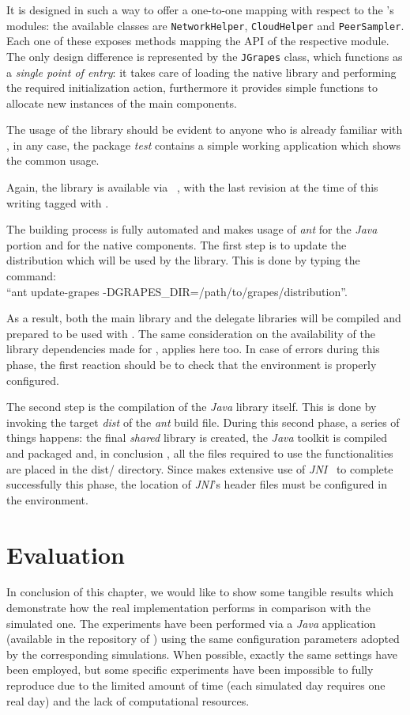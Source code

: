 It is designed in such a way to offer a one-to-one mapping with respect
to the \grapes's modules: the available classes are
\texttt{NetworkHelper}, \texttt{CloudHelper} and
\texttt{PeerSampler}. Each one of these exposes methods mapping the
API of the respective \grapes module. The only design difference is
represented by the \texttt{JGrapes} class, which functions as a
\textit{single point of entry}: it takes care of loading the native
library and performing the required initialization action, furthermore it
provides simple functions to allocate new instances of the main
components.

The usage of the library should be evident to anyone who is already
familiar with \grapes, in any case, the package \emph{test} contains
a simple working application which shows the common usage.

Again, the library is available via \github~\cite{jGRAPES-repo}, with
the last revision at the time of this writing tagged with
\thesistag.

The building process is fully automated and makes usage of \emph{ant}
for the \emph{Java} portion and \make for the native components. The
first step is to update the \grapes distribution which will be used by
the library.
This is done by typing the command: \\
``ant update-grapes
-DGRAPES\_DIR=/path/to/grapes/distribution''.

As a result, both the
main \grapes library and the \cloudhelper delegate libraries will be
compiled and prepared to be used with \jgrapes. The same consideration
on the availability of the library dependencies made for
\grapes, applies here too. In case of errors during this phase, the
first reaction should be to check that the environment is properly
configured.

The second step is the compilation of the \emph{Java} library
itself. This is done by invoking the target \textit{dist} of the
\emph{ant} build file. During this second phase, a series of things
happens: the final \emph{shared} library is created, the \textit{Java}
toolkit is compiled and packaged and, in conclusion , all the files
required to use the functionalities are placed in the \textsf{dist/}
directory.
Since \jgrapes makes extensive use of \emph{JNI}~\cite{JNIGuide} to
complete successfully this phase, the location of \emph{JNI}'s header
files must be configured in the environment.

\section{Evaluation}
In conclusion of this chapter, we would like to show some tangible
results which demonstrate how the real implementation performs in
comparison with the simulated one.
The experiments have been performed via a \emph{Java} application
(available in the repository of \jgrapes) using the same configuration
parameters adopted by the corresponding simulations. When possible,
exactly the same settings have been employed,
but some specific experiments have been impossible to fully reproduce due to
the limited amount of time (each simulated day requires one real day)
and the lack of computational resources.

